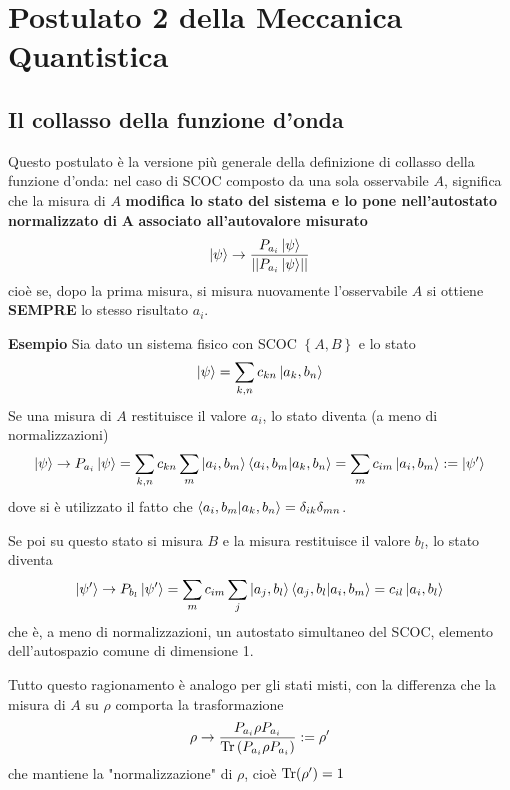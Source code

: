 \section{Postulato 2 della Meccanica Quantistica}
\noindent{}
\subsection{Il collasso della funzione d'onda}

Questo postulato è la versione più generale della definizione di collasso della funzione d'onda:
nel caso di SCOC composto da una sola osservabile $A$, significa che la misura di $A$ \textbf{modifica lo
stato del sistema e lo pone nell'autostato normalizzato di} $\mathbf{A}$ \textbf{associato all'autovalore
misurato}
$$\ket{\psi}\rightarrow \frac{P_{a_i}\ket{\psi}}{\left|\left| P_{a_i}\ket{\psi} \right|\right|}$$
cioè se, dopo la prima misura, si misura nuovamente l'osservabile $A$ si ottiene \textbf{SEMPRE} lo stesso
risultato $a_i$.


\textbf{Esempio} Sia dato un sistema fisico con SCOC $\left\{A,B\right\}$ e lo stato 
$$\ket{\psi} = \sum_{k,n} c_{kn}\ket{a_k,b_n}$$
Se una misura di $A$ restituisce il valore $a_i$, lo stato diventa (a meno di normalizzazioni)
$$\ket{\psi}\rightarrow P_{a_i}\ket{\psi}=
\sum_{k,n}c_{kn}\sum_{m}\ket{a_i,b_m}\bra{a_i,b_m}\ket{a_k,b_n} = \sum_{m}c_{im}\ket{a_i,b_m}:=\ket{\psi'}
$$
dove si è utilizzato il fatto che $\bra{a_i,b_m}\ket{a_k,b_n} = \delta_{ik}\delta_{mn}$.

Se poi su questo stato si misura $B$ e la misura restituisce il valore $b_l$, lo stato diventa
$$\ket{\psi'} \rightarrow P_{b_l}\ket{\psi'} =
\sum_{m}c_{im}\sum_{j}\ket{a_j,b_l}\bra{a_j,b_l}\ket{a_i,b_m} = c_{il}\ket{a_i,b_l}$$
che è, a meno di normalizzazioni, un autostato simultaneo del SCOC, elemento dell'autospazio comune di 
dimensione 1.

Tutto questo ragionamento è analogo per gli stati misti, con la differenza che la misura di $A$ su $\rho$
comporta la trasformazione
$$\rho\rightarrow \frac{P_{a_i}\rho P_{a_i}}{\Tr\left(P_{a_i}\rho P_{a_i}\right)}:=\rho'$$
che mantiene la "normalizzazione" di $\rho$, cioè $\Tr(\rho')=1$

